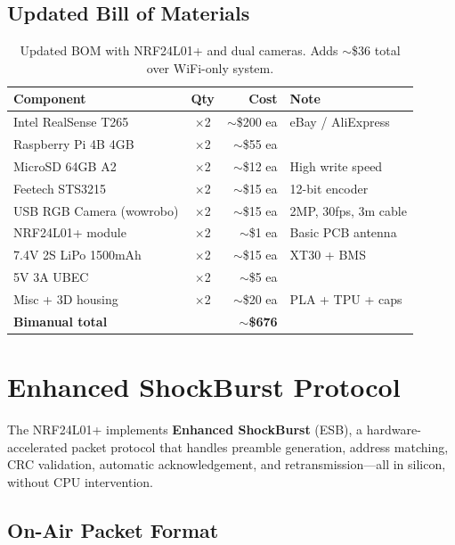 \documentclass[11pt,a4paper]{article}
\begin{document}
\subsection{Updated Bill of Materials}

\begin{table}[htbp]
\centering
\caption{Updated BOM with NRF24L01+ and dual cameras. Adds ${\sim}$\$36 total over WiFi-only system.}
\begin{tabular}{l c r l}
\toprule
\textbf{Component} & \textbf{Qty} & \textbf{Cost} & \textbf{Note} \\
\midrule
Intel RealSense T265 & $\times$2 & ${\sim}$\$200 ea & eBay / AliExpress \\
Raspberry Pi 4B 4GB & $\times$2 & ${\sim}$\$55 ea & \\
MicroSD 64GB A2 & $\times$2 & ${\sim}$\$12 ea & High write speed \\
Feetech STS3215 & $\times$2 & ${\sim}$\$15 ea & 12-bit encoder \\
USB RGB Camera (wowrobo) & $\times$2 & ${\sim}$\$15 ea & 2MP, 30fps, 3m cable \\
NRF24L01+ module & $\times$2 & ${\sim}$\$1 ea & Basic PCB antenna \\
7.4V 2S LiPo 1500mAh & $\times$2 & ${\sim}$\$15 ea & XT30 + BMS \\
5V 3A UBEC & $\times$2 & ${\sim}$\$5 ea & \\
Misc + 3D housing & $\times$2 & ${\sim}$\$20 ea & PLA + TPU + caps \\
\midrule
\textbf{Bimanual total} & & \textbf{${\sim}$\$676} & \\
\bottomrule
\end{tabular}
\label{tab:bom}
\end{table}


\section{Enhanced ShockBurst Protocol}

The NRF24L01+ implements \textbf{Enhanced ShockBurst} (ESB), a hardware-accelerated packet protocol that handles preamble generation, address matching, CRC validation, automatic acknowledgement, and retransmission---all in silicon, without CPU intervention.

\subsection{On-Air Packet Format}
\end{document}
